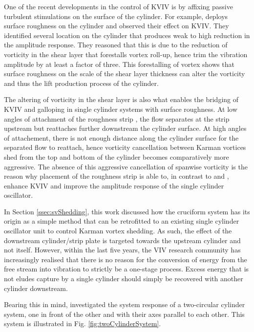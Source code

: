 \documentclass[oneside]{utmthesis}
\begin{document}
One of the recent developments in the control of KVIV is by affixing passive turbulent stimulations on the surface of the cylinder. For example, \citet{Park2016} deploys surface roughness on the cylinder and observed their effect on KVIV. They identified several location on the cylinder that produces weak to high reduction in the amplitude response. They reasoned that this is due to the reduction of vorticity in the shear layer that forestalls vortex roll-up, hence trim the vibration amplitude by at least a factor of three. This forestalling of vortex shows that surface roughness on the scale of the shear layer thickness can alter the vorticity and thus the lift production process of the cylinder.

The altering of vorticity in the shear layer is also what enables the bridging of KVIV and galloping in single cylinder systems with surface roughness. At low angles of attachment of the roughness strip \citep{Park2013}, the flow separates at the strip upstream but reattaches further downstream the cylinder surface. At high angles of attachement, there is not enough distance along the cylinder surface for the separated flow to reattach, hence vorticity cancellation between Karman vortices shed from the top and bottom of the cylinder becomes comparatively more aggressive. The absence of this aggressive cancellation of spanwise vorticity is the reason why placement of the roughness strip is able to, in contrast to \citet{Bernitsas2008c} and \citet{Park2016}, enhance KVIV and improve the amplitude response of the single cylinder oscillator.

In Section \ref{ssec:svShedding}, this work discussed how the cruciform system has its origin as a simple method that can be retrofitted to an existing single cylinder oscillator unit to control Karman vortex shedding. As such, the effect of the downstream cylinder/strip plate is targeted towards the upstream cylinder and not itself. However, within the last five years, the VIV research community has increasingly realised that there is no reason for the conversion of energy from the free stream into vibration to strictly be a one-stage process. Excess energy that is not eludes capture by a single cylinder should simply be recovered with another cylinder downstream.

Bearing this in mind, \citet{Ding2017} investigated the system response of a two-circular cylinder system, one in front of the other and with their axes parallel to each other. This system is illustrated in Fig. \ref{fig:twoCylinderSystem}.
\end{document}
